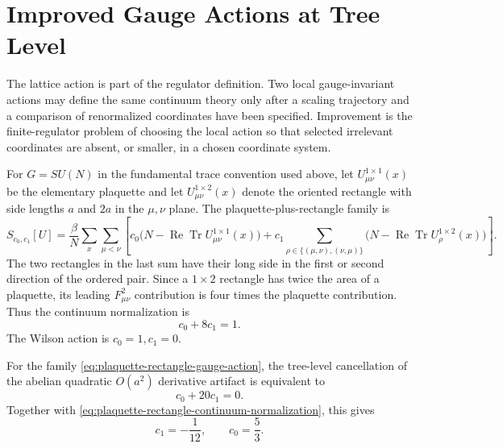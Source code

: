 \section{Improved Gauge Actions at Tree Level}
\label{sec:lattice-tree-level-improved-gauge-actions}

The lattice action is part of the regulator definition.  Two local
gauge-invariant actions may define the same continuum theory only after a
scaling trajectory and a comparison of renormalized coordinates have been
specified.  Improvement is the finite-regulator problem of choosing the
local action so that selected irrelevant coordinates are absent, or smaller,
in a chosen coordinate system.

For \(G=SU(N)\) in the fundamental trace convention used above, let
\(U_{\mu\nu}^{1\times1}(x)\) be the elementary plaquette and let
\(U_{\mu\nu}^{1\times2}(x)\) denote the oriented rectangle with side lengths
\(a\) and \(2a\) in the \(\mu,\nu\) plane.  The plaquette-plus-rectangle
family is
\begin{equation}
  S_{c_0,c_1}[U]
  =
  \frac{\beta}{N}
  \sum_x\sum_{\mu<\nu}
  \left[
    c_0\bigl(N-\operatorname{Re}\operatorname{Tr}U_{\mu\nu}^{1\times1}(x)\bigr)
    +c_1\sum_{\rho\in\{(\mu,\nu),(\nu,\mu)\}}
     \bigl(N-\operatorname{Re}\operatorname{Tr}U_\rho^{1\times2}(x)\bigr)
  \right].
  \label{eq:plaquette-rectangle-gauge-action}
\end{equation}
The two rectangles in the last sum have their long side in the first or
second direction of the ordered pair.  Since a \(1\times2\) rectangle has
twice the area of a plaquette, its leading \(F_{\mu\nu}^2\) contribution is
four times the plaquette contribution.  Thus the continuum normalization is
\begin{equation}
  c_0+8c_1=1.
  \label{eq:plaquette-rectangle-continuum-normalization}
\end{equation}
The Wilson action is \(c_0=1,c_1=0\).

\begin{lemma}
\label{lem:tree-level-rectangle-gauge-improvement}
For the family \eqref{eq:plaquette-rectangle-gauge-action}, the tree-level
cancellation of the abelian quadratic \(O(a^2)\) derivative artifact is
equivalent to
\begin{equation}
  c_0+20c_1=0.
  \label{eq:plaquette-rectangle-derivative-cancellation}
\end{equation}
Together with \eqref{eq:plaquette-rectangle-continuum-normalization}, this
gives
\begin{equation}
  c_1=-\frac{1}{12},\qquad c_0=\frac{5}{3}.
  \label{eq:tree-level-symanzik-gauge-coefficients}
\end{equation}
\end{lemma}

